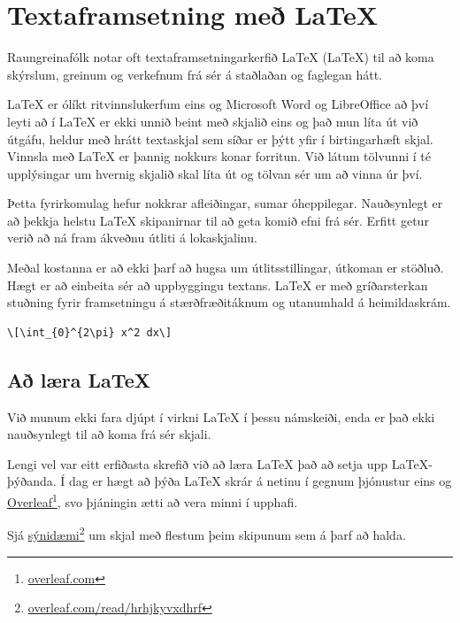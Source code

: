 \documentclass[justified,nobib]{tufte-handout}
\begin{document}
\section{Textaframsetning með LaTeX}
Raungreinafólk notar oft textaframsetningarkerfið LaTeX (\LaTeX) til að koma skýrslum, greinum og verkefnum frá sér á staðlaðan og faglegan hátt.

LaTeX er ólíkt ritvinnslukerfum eins og Microsoft Word og LibreOffice að því leyti að í LaTeX er ekki unnið beint með skjalið eins og það mun líta út við útgáfu, heldur með hrátt textaskjal sem síðar er þýtt yfir í birtingarhæft skjal. Vinnsla með LaTeX er þannig nokkurs konar forritun. Við látum tölvunni í té upplýsingar um hvernig skjalið skal líta út og tölvan sér um að vinna úr því.

Þetta fyrirkomulag hefur nokkrar afleiðingar, sumar óheppilegar. Nauðsynlegt er að þekkja helstu LaTeX skipanirnar til að geta komið efni frá sér. Erfitt getur verið að ná fram ákveðnu útliti á lokaskjalinu.

Meðal kostanna er að ekki þarf að hugsa um útlitsstillingar, útkoman er stöðluð. Hægt er að einbeita sér að uppbyggingu textans.
LaTeX er með gríðarsterkan stuðning fyrir framsetningu á stærðfræðitáknum og utanumhald á heimildaskrám.

\begin{example}
\caption{LaTeX kóði}
\begin{verbatim}
\[\int_{0}^{2\pi} x^2 dx\]
\end{verbatim}
\end{example}

\subsection{Að læra LaTeX}
Við munum ekki fara djúpt í virkni LaTeX í þessu námskeiði, enda er það ekki nauðsynlegt til að koma frá sér skjali.

Lengi vel var eitt erfiðasta skrefið við að læra LaTeX það að setja upp LaTeX-þýðanda. Í dag er hægt að þýða LaTeX skrár á netinu í gegnum þjónustur eins og \href{https://www.overleaf.com/}{Overleaf}\footnote{\href{https://www.overleaf.com/}{overleaf.com}}, svo þjáningin ætti að vera minni í upphafi.

Sjá \href{https://www.overleaf.com/read/hrhjkyvxdhrf}{sýnidæmi}\footnote{\href{https://www.overleaf.com/read/hrhjkyvxdhrf}{overleaf.com/read/hrhjkyvxdhrf}} um skjal með flestum þeim skipunum sem á þarf að halda.
\end{document}
